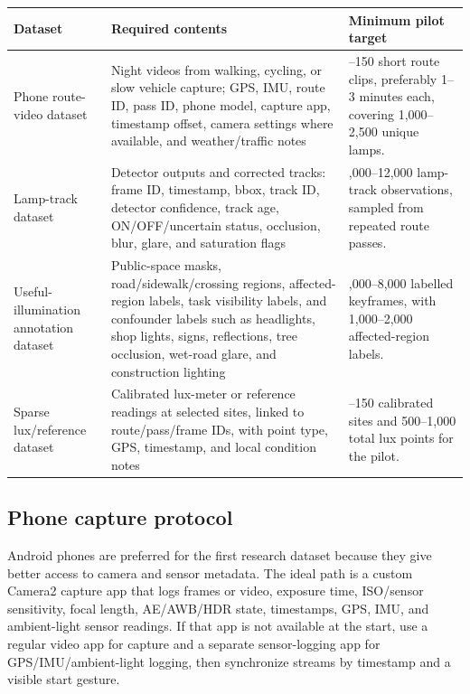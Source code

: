 \documentclass[11pt]{article}
\renewcommand{\arraystretch}{1.18}
\begin{document}
\begingroup
\small
\setlength{\tabcolsep}{4pt}
\renewcommand{\arraystretch}{1.15}
\begin{center}
\begin{tabularx}{\textwidth}{>{\raggedright\arraybackslash}p{}>{\raggedright\arraybackslash}X>{\raggedright\arraybackslash}p{}}
\toprule
Dataset & Required contents & Minimum pilot target \\
\midrule
Phone route-video dataset & Night videos from walking, cycling, or slow vehicle capture; GPS, IMU, route ID, pass ID, phone model, capture app, timestamp offset, camera settings where available, and weather/traffic notes & 80--150 short route clips, preferably 1--3 minutes each, covering 1,000--2,500 unique lamps. \\
Lamp-track dataset & Detector outputs and corrected tracks: frame ID, timestamp, bbox, track ID, detector confidence, track age, ON/OFF/uncertain status, occlusion, blur, glare, and saturation flags & 6,000--12,000 lamp-track observations, sampled from repeated route passes. \\
Useful-illumination annotation dataset & Public-space masks, road/sidewalk/crossing regions, affected-region labels, task visibility labels, and confounder labels such as headlights, shop lights, signs, reflections, tree occlusion, wet-road glare, and construction lighting & 5,000--8,000 labelled keyframes, with 1,000--2,000 affected-region labels. \\
Sparse lux/reference dataset & Calibrated lux-meter or reference readings at selected sites, linked to route/pass/frame IDs, with point type, GPS, timestamp, and local condition notes & 80--150 calibrated sites and 500--1,000 total lux points for the pilot. \\
\bottomrule
\end{tabularx}
\end{center}
\endgroup

\subsection{Phone capture protocol}

Android phones are preferred for the first research dataset because they give better access to camera and sensor metadata. The ideal path is a custom Camera2 capture app that logs frames or video, exposure time, ISO/sensor sensitivity, focal length, AE/AWB/HDR state, timestamps, GPS, IMU, and ambient-light sensor readings. If that app is not available at the start, use a regular video app for capture and a separate sensor-logging app for GPS/IMU/ambient-light logging, then synchronize streams by timestamp and a visible start gesture.
\end{document}
